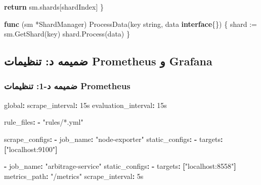 \documentclass[
]{article}
\newenvironment{Shaded}{}{}
\newcommand{\AttributeTok}[1]{\textcolor[rgb]{0.49,0.56,0.16}{#1}}
\newcommand{\ControlFlowTok}[1]{\textcolor[rgb]{0.00,0.44,0.13}{\textbf{#1}}}
\newcommand{\DataTypeTok}[1]{\textcolor[rgb]{0.56,0.13,0.00}{#1}}
\newcommand{\FunctionTok}[1]{\textcolor[rgb]{0.02,0.16,0.49}{#1}}
\newcommand{\KeywordTok}[1]{\textcolor[rgb]{0.00,0.44,0.13}{\textbf{#1}}}
\newcommand{\NormalTok}[1]{#1}
\newcommand{\OperatorTok}[1]{\textcolor[rgb]{0.40,0.40,0.40}{#1}}
\newcommand{\StringTok}[1]{\textcolor[rgb]{0.25,0.44,0.63}{#1}}
\begin{document}
\begin{Shaded}
\begin{Highlighting}[]
    \ControlFlowTok{return}\NormalTok{ sm}\OperatorTok{.}\NormalTok{shards}\OperatorTok{[}\NormalTok{shardIndex}\OperatorTok{]}
\OperatorTok{\}}

\KeywordTok{func} \OperatorTok{(}\NormalTok{sm }\OperatorTok{*}\NormalTok{ShardManager}\OperatorTok{)}\NormalTok{ ProcessData}\OperatorTok{(}\NormalTok{key }\DataTypeTok{string}\OperatorTok{,}\NormalTok{ data }\KeywordTok{interface}\OperatorTok{\{\})} \OperatorTok{\{}
\NormalTok{    shard }\OperatorTok{:=}\NormalTok{ sm}\OperatorTok{.}\NormalTok{GetShard}\OperatorTok{(}\NormalTok{key}\OperatorTok{)}
\NormalTok{    shard}\OperatorTok{.}\NormalTok{Process}\OperatorTok{(}\NormalTok{data}\OperatorTok{)}
\OperatorTok{\}}
\end{Highlighting}
\end{Shaded}

\subsection{ضمیمه د: تنظیمات Prometheus و
Grafana}\label{ux636ux645ux6ccux645ux647-ux62f-ux62aux646ux638ux6ccux645ux627ux62a-prometheus-ux648-grafana}

\subsubsection{ضمیمه د-1: تنظیمات
Prometheus}\label{ux636ux645ux6ccux645ux647-ux62f-1-ux62aux646ux638ux6ccux645ux627ux62a-prometheus}

\begin{Shaded}
\begin{Highlighting}[]
\FunctionTok{global}\KeywordTok{:}
\AttributeTok{  }\FunctionTok{scrape\_interval}\KeywordTok{:}\AttributeTok{ 15s}
\AttributeTok{  }\FunctionTok{evaluation\_interval}\KeywordTok{:}\AttributeTok{ 15s}

\FunctionTok{rule\_files}\KeywordTok{:}
\AttributeTok{  }\KeywordTok{{-}}\AttributeTok{ }\StringTok{"rules/*.yml"}

\FunctionTok{scrape\_configs}\KeywordTok{:}
\AttributeTok{  }\KeywordTok{{-}}\AttributeTok{ }\FunctionTok{job\_name}\KeywordTok{:}\AttributeTok{ }\StringTok{"node{-}exporter"}
\AttributeTok{    }\FunctionTok{static\_configs}\KeywordTok{:}
\AttributeTok{      }\KeywordTok{{-}}\AttributeTok{ }\FunctionTok{targets}\KeywordTok{:}\AttributeTok{ }\KeywordTok{[}\StringTok{"localhost:9100"}\KeywordTok{]}

\AttributeTok{  }\KeywordTok{{-}}\AttributeTok{ }\FunctionTok{job\_name}\KeywordTok{:}\AttributeTok{ }\StringTok{"arbitrage{-}service"}
\AttributeTok{    }\FunctionTok{static\_configs}\KeywordTok{:}
\AttributeTok{      }\KeywordTok{{-}}\AttributeTok{ }\FunctionTok{targets}\KeywordTok{:}\AttributeTok{ }\KeywordTok{[}\StringTok{"localhost:8558"}\KeywordTok{]}
\AttributeTok{    }\FunctionTok{metrics\_path}\KeywordTok{:}\AttributeTok{ }\StringTok{"/metrics"}
\AttributeTok{    }\FunctionTok{scrape\_interval}\KeywordTok{:}\AttributeTok{ 5s}
\end{Highlighting}
\end{Shaded}
\end{document}
